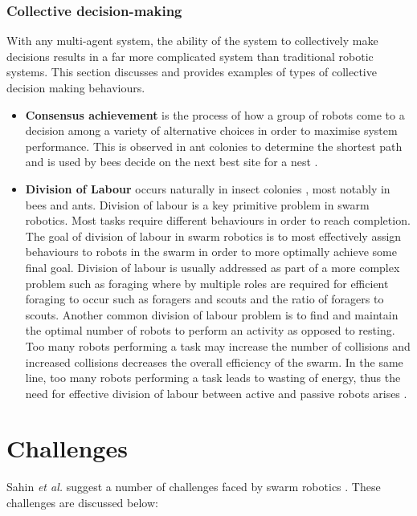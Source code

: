 \subsubsection{Collective decision-making}
With any multi-agent system, the ability of the system to collectively make decisions results in a far more complicated system than traditional robotic systems. This section discusses and provides examples of types of collective decision making behaviours. 

\begin{itemize}
	\item \textbf{Consensus achievement} is the process of how a group of robots come to a decision among a variety of alternative choices in order to maximise system performance. This is observed in ant colonies to determine the shortest path \cite{bonabeau2001self} and is used by bees decide on the next best site for a nest \cite{seeley2001nest}.
	
	\item \textbf{Division of Labour} occurs naturally in insect colonies \cite{gautrais2002emergent}, most notably in bees and ants. Division of labour is a key primitive problem in swarm robotics. Most tasks require different behaviours in order to reach completion. The goal of division of labour in swarm robotics is to most effectively assign behaviours to robots in the swarm in order to more optimally achieve some final goal. Division of labour is usually addressed as part of a more complex problem such as foraging where by multiple roles are required for efficient foraging to occur such as foragers and scouts and the ratio of foragers to scouts. Another common division of labour problem is to find and maintain the optimal number of robots to perform an activity as opposed to resting. Too many robots performing a task may increase the number of collisions and increased collisions decreases the overall efficiency of the swarm. In the same line, too many robots performing a task leads to wasting of energy, thus the need for effective division of labour between active and passive robots arises \cite{jones2003adaptive, krieger2000call}.

\end{itemize}

\section{Challenges}
\label{challenges}

Sahin \textit{et al.} suggest a number of challenges faced by swarm robotics \cite{csahin2008special}. These challenges are discussed below: 

